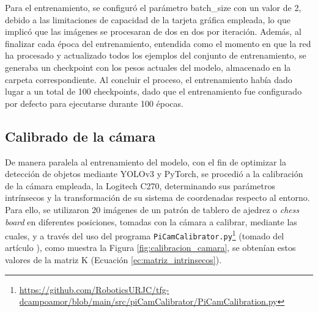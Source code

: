 Para el entrenamiento, se configuró el parámetro batch\_size con un valor de 2, debido a las limitaciones de capacidad de la tarjeta gráfica empleada, lo que implicó que las imágenes se procesaran de dos en dos por iteración. Además, al finalizar cada época del entrenamiento, entendida como el momento en que la red ha procesado y actualizado todos los ejemplos del conjunto de entrenamiento, se generaba un checkpoint con los pesos actuales del modelo, almacenado en la carpeta correspondiente. Al concluir el proceso, el entrenamiento había dado lugar a un total de 100 checkpoints, dado que el entrenamiento fue configurado por defecto para ejecutarse durante 100 épocas.

\subsection{Calibrado de la cámara}
\label{sec:Calibrado_camara}

De manera paralela al entrenamiento del modelo, con el fin de optimizar la detección de objetos mediante YOLOv3 y PyTorch, se procedió a la calibración de la cámara empleada, la Logitech C270, determinando sus parámetros intrínsecos y la transformación de su sistema de coordenadas respecto al entorno. Para ello, se utilizaron 20 imágenes de un patrón de tablero de ajedrez o \textit{chess board} en diferentes posiciones, tomadas con la cámara a calibrar, mediante las cuales, y a través del uso del programa \verb|PiCamCalibrator.py|\footnote{\url{https://github.com/RoboticsURJC/tfg-dcampoamor/blob/main/src/piCamCalibrator/PiCamCalibration.py}} (tomado del artículo \cite{Vega21}), como muestra la Figura \ref{fig:calibracion_camara}, se obtenían estos valores de la matriz K (Ecuación \ref{ec:matriz_intrinsecos}). 

